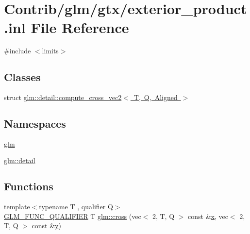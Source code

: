 \hypertarget{exterior__product_8inl}{}\section{Contrib/glm/gtx/exterior\+\_\+product.inl File Reference}
\label{exterior__product_8inl}
{\ttfamily \#include $<$limits$>$}\newline
\subsection*{Classes}
\begin{DoxyCompactItemize}
\item 
struct \mbox{\hyperlink{structglm_1_1detail_1_1compute__cross__vec2}{glm\+::detail\+::compute\+\_\+cross\+\_\+vec2$<$ T, Q, Aligned $>$}}
\end{DoxyCompactItemize}
\subsection*{Namespaces}
\begin{DoxyCompactItemize}
\item 
 \mbox{\hyperlink{namespaceglm}{glm}}
\item 
 \mbox{\hyperlink{namespaceglm_1_1detail}{glm\+::detail}}
\end{DoxyCompactItemize}
\subsection*{Functions}
\begin{DoxyCompactItemize}
\item 
{\footnotesize template$<$typename T , qualifier Q$>$ }\\\mbox{\hyperlink{setup_8hpp_a33fdea6f91c5f834105f7415e2a64407}{G\+L\+M\+\_\+\+F\+U\+N\+C\+\_\+\+Q\+U\+A\+L\+I\+F\+I\+ER}} T \mbox{\hyperlink{group__gtx__exterior__product_gac36e72b934ea6a9dd313772d7e78fa93}{glm\+::cross}} (vec$<$ 2, T, Q $>$ const \&\mbox{\hyperlink{_s_d_l__opengl_8h_ad0e63d0edcdbd3d79554076bf309fd47}{x}}, vec$<$ 2, T, Q $>$ const \&\mbox{\hyperlink{_s_d_l__opengl_8h_a1675d9d7bb68e1657ff028643b4037e3}{y}})
\end{DoxyCompactItemize}
